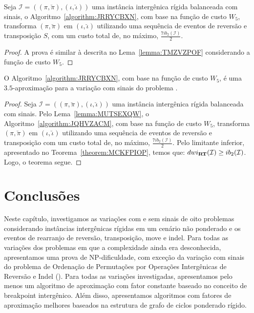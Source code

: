 \begin{lemma}\label{lemma:MUTSEXQW}
Seja $\mathcal{I} = ((\pi,\breve\pi),(\iota,\breve\iota))$ uma instância intergênica rígida balanceada com sinais, o Algoritmo~\ref{algorithm:JRRYCBXN}, com base na função de custo $W_5$, transforma $(\pi,\breve\pi)$ em $(\iota,\breve\iota)$ utilizando uma sequência de eventos de reversão e transposição $S$, com um custo total de, no máximo, $\frac{7ib_2(\mathcal{I})}{2}$.
\end{lemma}
\begin{proof}
A prova é similar à descrita no Lema~\ref{lemma:TMZVZPOF} considerando a função de custo $W_5$.
\end{proof}

\begin{theorem}\label{theorem:ZYFESTTM}
O Algoritmo~\ref{algorithm:JRRYCBXN}, com base na função de custo $W_5$, é uma $3.5$-aproxima\-ção para a variação com sinais do problema \SbWIRT{}.
\end{theorem}
\begin{proof}
Seja $\mathcal{I} = ((\pi,\breve\pi),(\iota,\breve\iota))$ uma instância intergênica rígida balanceada com sinais. Pelo Lema~\ref{lemma:MUTSEXQW}, o Algoritmo~\ref{algorithm:JQHVZACM}, com base na função de custo $W_5$, transforma $(\pi,\breve\pi)$ em $(\iota,\breve\iota)$ utilizando uma sequência de eventos de reversão e transposição com um custo total de, no máximo, $\frac{7ib_2(\mathcal{I})}{2}$. Pelo limitante inferior, apresentado no Teorema~\ref{theorem:MCKFPIOP}, temos que: $dwi_{\textbf{RT}}(\mathcal{I}) \ge ib_2(\mathcal{I})$. Logo, o teorema segue.
\end{proof}


\section{Conclusões}

Neste capítulo, investigamos as variações com e sem sinais de oito problemas considerando instâncias intergênicas rígidas em um cenário não ponderado e os eventos de rearranjo de reversão, transposição, move e indel. Para todas as variações dos problemas em que a complexidade ainda era desconhecida, apresentamos uma prova de NP-dificuldade, com exceção da variação com sinais do problema de Ordenação de Permutações por Operações Intergênicas de Reversão e Indel (\SbIRI). Para todas as variações investigadas, apresentamos pelo menos um algoritmo de aproximação com fator constante baseado no conceito de breakpoint intergênico. Além disso, apresentamos algoritmos com fatores de aproximação melhores baseados na estrutura de grafo de ciclos ponderado rígido.

